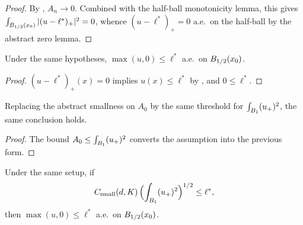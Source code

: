 \begin{proof}
\leanok
{}

By , $A_n \to 0$. Combined with
the half-ball monotonicity lemma, this gives
$\int_{B_{1/2}(x_0)} |(u-\ell^*)_+|^2 = 0$, whence
$(u-\ell^*)_+ = 0$ a.e.\ on the half-ball by the abstract zero
lemma.
\end{proof}

\begin{corollary}
\label{cor:linfty_subsolution_DeGiorgi_ae_of_smallness}
\leanok
{}
Under the same hypotheses, $\max(u, 0) \le \ell^*$ a.e.\ on
$B_{1/2}(x_0)$.
\end{corollary}

\begin{proof}
\leanok
{}

$(u-\ell^*)_+(x) = 0$ implies $u(x) \le \ell^*$ by
, and $0 \le \ell^*$.
\end{proof}

\begin{theorem}
\label{thm:linfty_subsolution_DeGiorgi_ae_of_unitBall_initial_energy_sm}
\leanok
{}
Replacing the abstract smallness on $A_0$ by the same threshold for
$\int_{B_{1}} (u_+)^2$, the same conclusion holds.
\end{theorem}

\begin{proof}
\leanok
{}

The bound $A_0 \le \int_{B_{1}} (u_+)^2$ converts the assumption
into the previous form.
\end{proof}

\begin{theorem}
\label{thm:linfty_subsolution_DeGiorgi_ae_of_unitBall_height_bound}
\leanok
{}
Under the same setup, if
\begin{equation*}
  C_{\mathrm{small}}(d,K)\,
    \Bigl(\int_{B_{1}} (u_+)^2\Bigr)^{1/2} \le \ell^*,
\end{equation*}
then $\max(u,0) \le \ell^*$ a.e.\ on $B_{1/2}(x_0)$.
\end{theorem}

